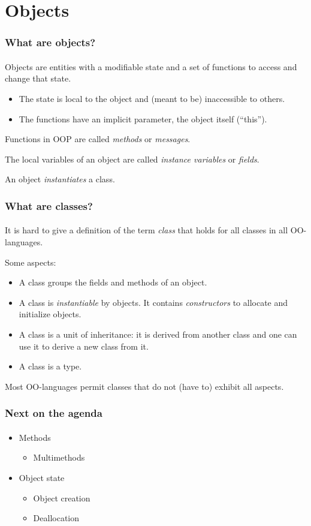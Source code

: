 \documentclass{beamer}
\begin{document}
\section{Objects}
\begin{frame}[fragile]
\frametitle{What are objects? }
\framesubtitle{}
Objects  are entities with a modifiable state and a set of functions to access
and change that state.
\begin{itemize}
\item The state is local to the object and (meant to be) inaccessible to 
others.
\item The functions have an implicit parameter, the object itself (``this'').
\end{itemize}

Functions in OOP are called \textit{methods} or \textit{messages}.
\bigskip

The local variables of an object are called \textit{instance variables}
or \textit{fields}.
\bigskip

An object \textit{instantiates} a class.
\end{frame}



\begin{frame}[fragile]
\frametitle{What are classes?}
\framesubtitle{}
It is hard to give a definition of the term \textit{class} that holds
for all classes in all OO-languages. 

\bigskip

Some aspects:

\begin{itemize}
\item A class groups the fields and methods of an object.
\item A class is \textit{instantiable} by objects.
It contains \textit{constructors} to allocate and initialize objects.
\item A class is a unit of inheritance: it is derived from another
class and one can use it to derive a new class from it. 
\item A class is a type. 
\end{itemize}
\bigskip

Most OO-languages permit classes that do not (have to) exhibit 
all aspects. 
\end{frame}

\begin{frame}[fragile]
\frametitle{Next on the agenda}
\framesubtitle{}
\begin{itemize}
\item Methods
\begin{itemize}
\item Multimethods
\end{itemize}
\item Object state
\begin{itemize}
\item Object creation 
\item Deallocation
\end{itemize}

\end{itemize}
\end{frame}
\end{document}
